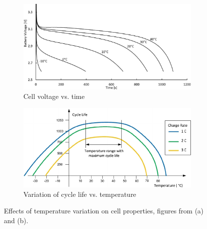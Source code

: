 \begin{figure}[H]
    \centering
    \begin{subfigure}[b]{0.47\textwidth} %
        \centering
        \includegraphics[width=\textwidth]{figs/Samuel/Figures/chenbattery.png}
        \caption{Cell voltage vs. time \cite{chen2013heat}}
        \label{fig:tempy1}
    \end{subfigure}
    \hspace{0.04\textwidth}
    \begin{subfigure}[b]{0.47
    \textwidth} %
        \centering
        \includegraphics[width=\textwidth]{figs/Samuel/Figures/Lithium-ion-battery-life-vs-temperature-and-charging-rate-36-39-44-45.png}
        \caption{Variation of cycle life vs. temperature \cite{REZVANIZANIANI2014110}}
        \label{fig:tempy2}
    \end{subfigure}
    \caption[Effects of Temperature Variation on Cell Properties]{Effects of temperature variation on cell properties, figures from \cite{chen2013heat} (a) and \cite{REZVANIZANIANI2014110} (b).}
    \label{fig:tempythings}
\end{figure}

